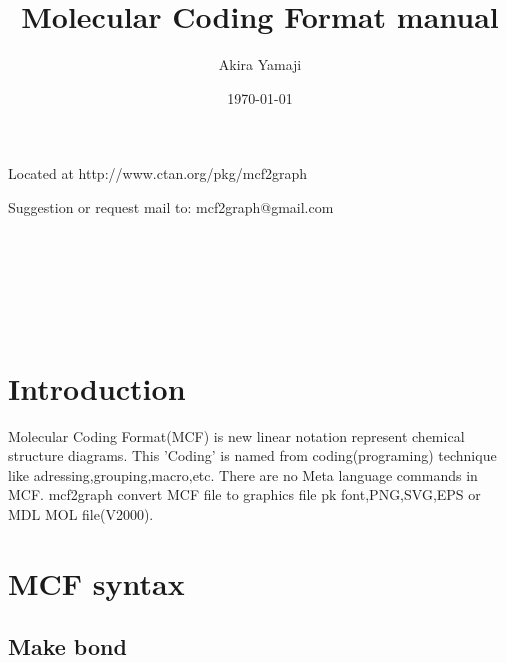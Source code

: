 \documentclass[a4paper]{article}
\begin{document}
\title{\Huge\sf Molecular Coding Format manual}
\author{Akira Yamaji}
\date{\today}
\maketitle
\begin{center} Located at http://www.ctan.org/pkg/mcf2graph \end{center}
\begin{center} Suggestion or request mail to: mcf2graph@gmail.com \end{center}
\thispagestyle{empty}
\vspace{3mm}%
\begin{center}
{\@strufont%
  \\
  \\
 \\
\\
\\
}%
\end{center}
\twocolumn
\thispagestyle{empty}
\tableofcontents
\linethickness{0.08mm}%
\newpage
\setcounter{page}{1}
\section{Introduction}
Molecular Coding Format(MCF) is new linear notation
represent chemical structure diagrams.
This 'Coding' is named from coding(programing) technique
like adressing,grouping,macro,etc. 
There are no Meta language commands in MCF.
mcf2graph convert MCF file to graphics file
pk font,PNG,SVG,EPS or MDL MOL file(V2000).\\
\section{MCF syntax}
\subsection{Make bond}
\end{document}
